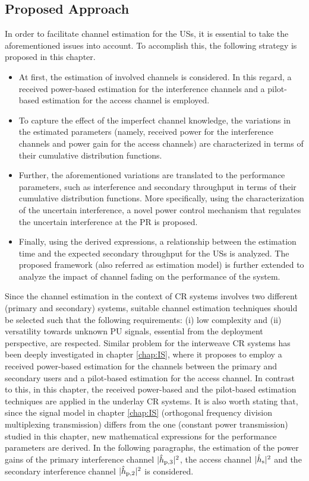 \subsection{Proposed Approach} 
In order to facilitate channel estimation for the USs, it is essential to take the aforementioned issues into account. To accomplish this, the following strategy is proposed in this chapter.
\begin{itemize}
\item At first, the estimation of involved channels is considered. In this regard, a received power-based estimation for the interference channels and a pilot-based estimation for the access channel is employed. 
\item To capture the effect of the imperfect channel knowledge, the variations in the estimated parameters (namely, received power for the interference channels and power gain for the access channels) are characterized in terms of their cumulative distribution functions.
\item Further, the aforementioned variations are translated to the performance parameters, such as interference and secondary throughput in terms of their cumulative distribution functions. More specifically, using the characterization of the uncertain interference, a novel power control mechanism that regulates the uncertain interference at the PR is proposed.  
\item Finally, using the derived expressions, a relationship between the estimation time and the expected secondary throughput for the USs is analyzed. The proposed framework (also referred as estimation model) is further extended to analyze the impact of channel fading on the performance of the system. 
\end{itemize}
Since the channel estimation in the context of CR systems involves two different (primary and secondary) systems, suitable channel estimation techniques should be selected such that the following requirements: (i) low complexity and (ii) versatility towards unknown PU signals, essential from the deployment perspective, are respected. Similar problem for the interweave CR systems has been deeply investigated in chapter \ref{chap:IS}, where it proposes to employ a received power-based estimation for the channels between the primary and secondary users and a pilot-based estimation for the access channel. In contrast to this, in this chapter, the received power-based and the pilot-based estimation techniques are applied in the underlay CR systems. It is also worth stating that, since the signal model in chapter \ref{chap:IS} (orthogonal frequency division multiplexing transmission) differs from the one (constant power transmission) studied in this chapter, new mathematical expressions for the performance parameters are derived. 
In the following paragraphs, the estimation of the power gains of the primary interference channel $|\hat{h}_{\text{p,3}}|^2$, the access channel $|\hat{h}_{\text{s}}|^2$ and the secondary interference channel $|\hat{h}_{\text{p,2}}|^2$ is considered. 
